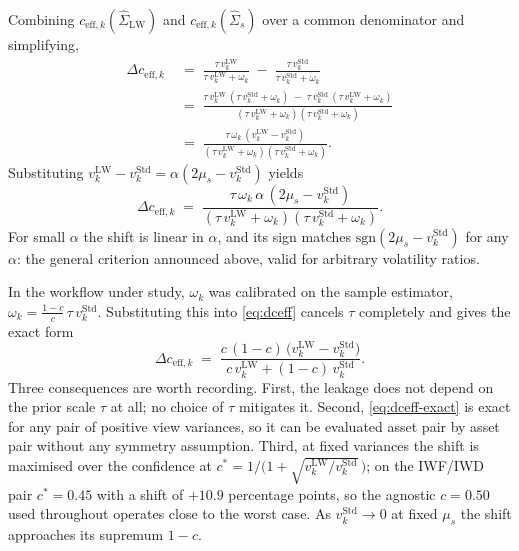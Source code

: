 \documentclass[a4paper,11pt]{article}
\theoremstyle{plain}
\theoremstyle{definition}
\newcommand{\Std}{\mathrm{Std}}
\newcommand{\LW}{\mathrm{LW}}
\newcommand{\eff}{\mathrm{eff}}
\begin{document}
Combining $c_{\eff,k}(\hat\Sigma_{\LW})$ and $c_{\eff,k}(\hat\Sigma_s)$
over a common denominator and simplifying,
\begin{align*}
  \Delta c_{\eff,k}
  \;&=\; \frac{\tau\,v_k^\LW}{\tau\,v_k^\LW + \omega_k}
        \;-\; \frac{\tau\,v_k^\Std}{\tau\,v_k^\Std + \omega_k}\\
  \;&=\; \frac{\tau\,v_k^\LW\,(\tau\,v_k^\Std + \omega_k) \;-\; \tau\,v_k^\Std\,(\tau\,v_k^\LW + \omega_k)}
              {(\tau\,v_k^\LW + \omega_k)(\tau\,v_k^\Std + \omega_k)}\\
  \;&=\; \frac{\tau\,\omega_k\,(v_k^\LW - v_k^\Std)}
              {(\tau\,v_k^\LW + \omega_k)(\tau\,v_k^\Std + \omega_k)}.
\end{align*}
Substituting $v_k^\LW - v_k^\Std = \alpha(2\mu_s - v_k^\Std)$ yields
\begin{equation}
\label{eq:dceff}
  \Delta c_{\eff,k}
  \;=\;
  \frac{\tau\,\omega_k\,\alpha\,(2\mu_s - v_k^\Std)}
       {(\tau\,v_k^\LW + \omega_k)(\tau\,v_k^\Std + \omega_k)}.
\end{equation}
For small $\alpha$ the shift is linear in $\alpha$, and its sign matches
$\mathrm{sgn}(2\mu_s - v_k^\Std)$ for any $\alpha$: the general criterion
announced above, valid for arbitrary volatility ratios.

In the workflow under study, $\omega_k$ was calibrated on the sample
estimator, $\omega_k = \tfrac{1-c}{c}\,\tau\,v_k^\Std$. Substituting
this into \eqref{eq:dceff} cancels $\tau$ completely and gives the exact
form
\begin{equation}
\label{eq:dceff-exact}
  \Delta c_{\eff,k}
  \;=\;
  \frac{c\,(1-c)\,\bigl(v_k^\LW - v_k^\Std\bigr)}
       {c\,v_k^\LW + (1-c)\,v_k^\Std}.
\end{equation}
Three consequences are worth recording. First, the leakage does not
depend on the prior scale $\tau$ at all; no choice of $\tau$ mitigates
it. Second, \eqref{eq:dceff-exact} is exact for any pair of positive
view variances, so it can be evaluated asset pair by asset pair without
any symmetry assumption. Third, at fixed variances the shift is
maximised over the confidence at
$c^* = 1/\bigl(1+\sqrt{v_k^{\LW}/v_k^\Std}\,\bigr)$; on the IWF/IWD
pair $c^* = 0.45$ with a shift of $+10.9$ percentage points, so the
agnostic $c = 0.50$ used throughout operates close to the worst case.
As $v_k^\Std \to 0$ at fixed $\mu_s$ the shift approaches its supremum
$1-c$.
\end{document}
